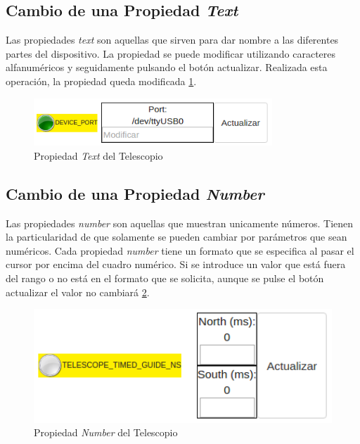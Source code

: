 \subsection{Cambio de una Propiedad \textit{Text}}
Las propiedades \textit{text} son aquellas que sirven para dar nombre a las diferentes partes del dispositivo.
La propiedad se puede modificar utilizando caracteres alfanuméricos y seguidamente pulsando el botón actualizar. Realizada esta operación, la propiedad queda modificada \ref{fig:propiedadText}.
\begin{figure}[htb]
\centering
\includegraphics[width=0.8\textwidth]{./imagenes/capturaText}
\caption{Propiedad \textit{Text} del Telescopio} \label{fig:propiedadText}
\end{figure}

\subsection{Cambio de una Propiedad \textit{Number}}
Las propiedades \textit{number} son aquellas que muestran unicamente números. Tienen la particularidad de que solamente se pueden cambiar por parámetros que sean numéricos. Cada propiedad \textit{number} tiene un formato que se especifica al pasar el cursor por encima del cuadro numérico. Si se introduce un valor que está fuera del rango o no está en el formato que se solicita, aunque se pulse el botón actualizar el valor no cambiará \ref{fig:propiedadNumber}.
\begin{figure}[htb]
\centering
\includegraphics[width=1\textwidth]{./imagenes/capturaNumber}
\caption{Propiedad \textit{Number} del Telescopio} \label{fig:propiedadNumber}
\end{figure}

